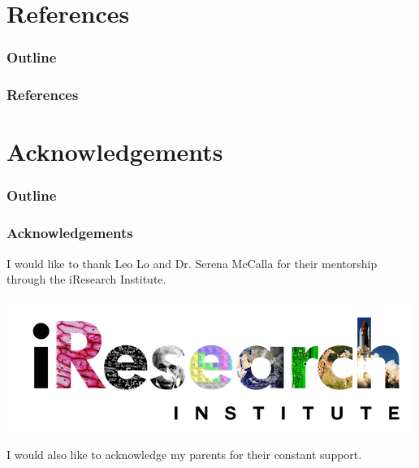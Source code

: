 \documentclass[12pt]{beamer}
\begin{document}
\section{References}
\begin{frame}
\frametitle{Outline}
\tableofcontents[currentsection]
\end{frame}

\begin{frame}
\frametitle{References}
\end{frame}


\section{Acknowledgements}
\begin{frame}
\frametitle{Outline}
\tableofcontents[currentsection]
\end{frame}

\begin{frame}
\frametitle{Acknowledgements}
I would like to thank Leo Lo and Dr. Serena McCalla for their mentorship through the iResearch Institute.

\begin{center}
\includegraphics[scale = 0.58]{iresearch.png}
\end{center}

I would also like to acknowledge my parents for their constant support.
\end{frame}
\end{document}
